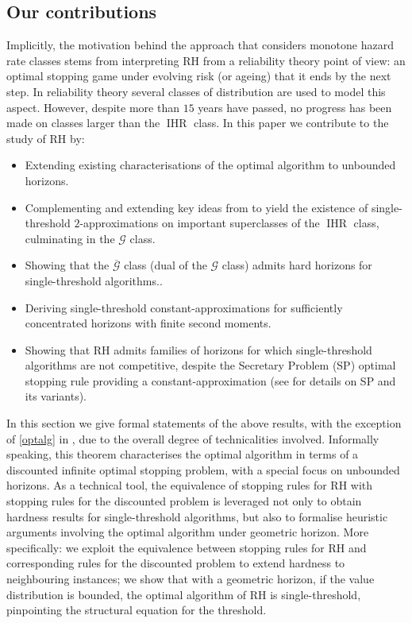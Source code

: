 \documentclass[11pt, a4paper, twoside]{article}
\newcommand{\PGF}{\mathcal{G}}
\newcommand{\PGFd}{\overline{\mathcal{G}}}
\DeclareMathOperator{\IHR}{IHR}
\numberwithin{equation}{section}
\begin{document}
	\subsection{Our contributions}\label{contributions}
	Implicitly, the motivation behind the approach that considers monotone hazard rate classes stems from interpreting RH from a reliability theory point of view: an optimal stopping game under evolving risk (or ageing) that it ends by the next step. In reliability theory several classes of distribution are used to model this aspect. However, despite more than $15$ years have passed, no progress has been made on classes larger than the $\IHR$ class. In this paper we contribute to the study of RH by:
	\begin{itemize}[noitemsep]
		\item Extending existing characterisations of the optimal algorithm to unbounded horizons.
		\item Complementing and extending key ideas from \cite{AliBanGolMunWan20} to yield the existence of single-threshold $2$-approximations on important superclasses of the $\IHR$ class, culminating in the $\PGF$ class.
		\item Showing that the $\PGFd$ class (dual of the $\PGF$ class) admits hard horizons for single-threshold algorithms..
		\item Deriving single-threshold constant-approximations for sufficiently concentrated horizons with finite second moments.
		\item Showing that RH admits families of horizons for which single-threshold algorithms are not competitive, despite the Secretary Problem (SP) optimal stopping rule providing a constant-approximation (see  for details on SP and its variants).
	\end{itemize}
	
	In this section we give formal statements of the above results, with the exception of \cref{optalg} in , due to the overall degree of technicalities involved. Informally speaking, this theorem characterises the optimal algorithm in terms of a discounted infinite optimal stopping problem, with a special focus on unbounded horizons. As a technical tool, the equivalence of stopping rules for RH with stopping rules for the discounted problem is leveraged not only to obtain hardness results for single-threshold algorithms, but also to formalise heuristic arguments involving the optimal algorithm under geometric horizon. More specifically: we exploit the equivalence between stopping rules for RH and corresponding rules for the discounted problem to extend hardness to neighbouring instances; we show that with a geometric horizon, if the value distribution is bounded, the optimal algorithm of RH is single-threshold, pinpointing the structural equation for the threshold. 
	
\end{document}
